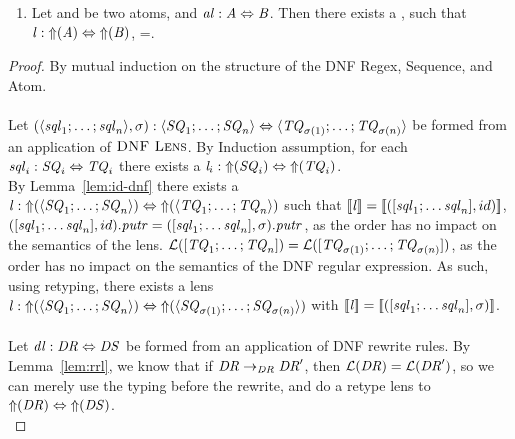 \begin{lemma}
\begin{enumerate}
\item Let \Atom{} and \AtomAlt{} be two atoms, and $\mathit{al} : \mathit{A} \Leftrightarrow \mathit{B}$.  Then there exists a \Lens{}, such that $\mathit{l} : \mathit{\Uparrow}(\mathit{A}) \Leftrightarrow \mathit{\Uparrow}(\mathit{B})$, \SemanticsOf{\Lens}=\SemanticsOf{\AtomLens}.
\end{enumerate}
\begin{proof}
By mutual induction on the structure of the DNF Regex, Sequence, and
Atom.\\ 
\\
Let $(\langle\mathit{sql}_1;\ldots;\mathit{sql}_n\rangle,\sigma) : \langle\mathit{SQ}_1;\ldots;\mathit{SQ}_n\rangle \Leftrightarrow \langle\mathit{TQ}_{\sigma(1)};\ldots;\mathit{TQ}_{\sigma(n)}\rangle$ be formed from an application of $\textsc{DNF Lens}$.
By Induction assumption, for each $\mathit{sql}_i : \mathit{SQ}_i \Leftrightarrow \mathit{TQ}_i$ there exists a $\mathit{l}_i : \mathit{\Uparrow}(\mathit{SQ}_i) \Leftrightarrow \mathit{\Uparrow}(\mathit{TQ}_i)$.\\
By Lemma~\ref{lem:id-dnf} there exists a $\mathit{l} : \mathit{\Uparrow}(\langle\mathit{SQ}_1;\ldots;\mathit{SQ}_{n}\rangle) \Leftrightarrow \mathit{\Uparrow}(\langle\mathit{TQ}_1;\ldots;\mathit{TQ}_{n}\rangle)$ such that $[ \! [\mathit{l}] \! ]=[ \! [([\mathit{sql}_1;\ldots\mathit{sql}_n],id)] \! ]$,
$([\mathit{sql}_1;\ldots\mathit{sql}_n],id).\mathit{putr}=([\mathit{sql}_1;\ldots\mathit{sql}_n],\sigma).\mathit{putr}$, as the order has no impact on the semantics of the lens.
$\mathcal{L}([\mathit{TQ}_1;\ldots;\mathit{TQ}_n])=\mathcal{L}([\mathit{TQ}_{\sigma(1)};\ldots;\mathit{TQ}_{\sigma(n)}])$, as the order has no impact on the semantics of the DNF regular expression.
As such, using retyping, there exists a lens
$\mathit{l}:\mathit{\Uparrow}(\langle\mathit{SQ}_1;\ldots;\mathit{SQ}_n\rangle) \Leftrightarrow \mathit{\Uparrow}(\langle\mathit{SQ}_{\sigma(1)};\ldots;\mathit{SQ}_{\sigma(n)}\rangle)$
with
$[ \! [\mathit{l}] \! ]=[ \! [([\mathit{sql}_1;\ldots\mathit{sql}_n],\sigma)] \! ]$.\\
\\
Let $\mathit{dl} : \mathit{DR} \Leftrightarrow \mathit{DS}$ be formed from
an application of DNF rewrite rules.  By Lemma~\ref{lem:rrl},
we know that if $\mathit{DR}\rightarrow_{\mathit{DR}}\mathit{DR}'$, then
$\mathcal{L}(\mathit{DR})=\mathcal{L}(\mathit{DR}')$,
so we can merely use the typing before the rewrite, and do a retype lens to
$\mathit{\Uparrow}(\mathit{DR}) \Leftrightarrow \mathit{\Uparrow}(\mathit{DS})$.\\

\end{proof}
\end{lemma}
